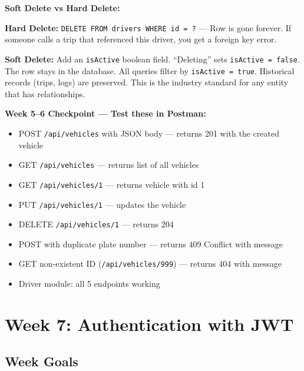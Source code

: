 \documentclass[12pt,a4paper]{report}
\newcommand{\code}[1]{\texttt{\textcolor{keywordblue}{#1}}}
\newcommand{\apipath}[1]{\texttt{\textcolor{dangerred}{#1}}}
\begin{document}
\begin{tcolorbox}[notebox]
\textbf{Soft Delete vs Hard Delete:}

\textbf{Hard Delete:} \code{DELETE FROM drivers WHERE id = ?} --- Row is gone forever. If someone calls a trip that referenced this driver, you get a foreign key error.

\textbf{Soft Delete:} Add an \code{isActive} boolean field. ``Deleting'' sets \code{isActive = false}. The row stays in the database. All queries filter by \code{isActive = true}. Historical records (trips, logs) are preserved. This is the industry standard for any entity that has relationships.
\end{tcolorbox}

\begin{tcolorbox}[successbox]
\textbf{Week 5--6 Checkpoint --- Test these in Postman:}
\begin{itemize}
  \item[$\checkmark$] POST \apipath{/api/vehicles} with JSON body --- returns 201 with the created vehicle
  \item[$\checkmark$] GET \apipath{/api/vehicles} --- returns list of all vehicles
  \item[$\checkmark$] GET \apipath{/api/vehicles/1} --- returns vehicle with id 1
  \item[$\checkmark$] PUT \apipath{/api/vehicles/1} --- updates the vehicle
  \item[$\checkmark$] DELETE \apipath{/api/vehicles/1} --- returns 204
  \item[$\checkmark$] POST with duplicate plate number --- returns 409 Conflict with message
  \item[$\checkmark$] GET non-existent ID (\apipath{/api/vehicles/999}) --- returns 404 with message
  \item[$\checkmark$] Driver module: all 5 endpoints working
\end{itemize}
\end{tcolorbox}

\chapter{Week 7: Authentication with JWT}

\section{Week Goals}
\end{document}
